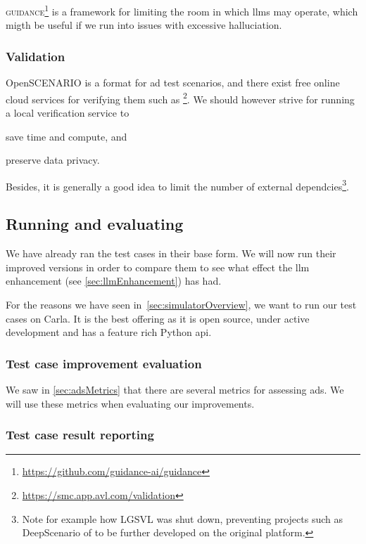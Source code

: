 \textsc{guidance}\footnote{\url{https://github.com/guidance-ai/guidance}} is a
framework for limiting the room in which \acrshort{llms} may operate, which
migth be useful if we run into issues with excessive halluciation.


\subsubsection{Validation}

OpenSCENARIO is a format for \acrshort{ad} test scenarios, and there exist free
online cloud services for verifying them such as
\footnote{\url{https://smc.app.avl.com/validation}}. We should however strive for
running a local verification service to \begin{inparaenum}
    \item save time and compute,
    and
    \item preserve data privacy.
\end{inparaenum}

Besides, it is generally a good idea to limit the number of external dependcies\footnote{
    Note for example how LGSVL\cite{lgsvl} was shut down, preventing projects such as
    DeepScenario of \citeauthor{DeepScenario} to be further developed on the
    original platform.}.

\subsection{Running and evaluating}

We have already ran the test cases in their base form. We will now run their
improved versions in order to compare them to see what effect the \acrshort{llm}
enhancement (see \cref{sec:llmEnhancement}) has had.

For the reasons we have seen in~\cref{sec:simulatorOverview}, we want to run our
test cases on Carla. It is the best offering as it is open source, under active
development and has a feature rich Python \acrshort{api}.

\subsubsection{Test case improvement evaluation}\label{sec:testCaseEval}

We saw in \cref{sec:adsMetrics} that there are several metrics for assessing
\acrshort{ads}. We will use these metrics when evaluating our improvements.

\subsubsection{Test case result reporting}

